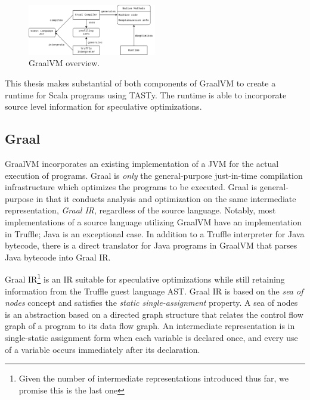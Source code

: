 \begin{figure}[!htb]
	\centering
	\includegraphics[width=0.5\textwidth]{figures/graalvm-pipeline.png}
	\caption{GraalVM overview\cite{graalvm:ir}.}
\end{figure}

This thesis makes substantial of both components of GraalVM to create a runtime for Scala programs using TASTy.
The runtime is able to incorporate source level information for speculative optimizations.

\subsection{Graal}

GraalVM incorporates an existing implementation of a JVM\cite{java:hotspot} for the actual execution of programs.
Graal is \textit{only} the general-purpose just-in-time compilation infrastructure which optimizes the programs to be executed.
Graal is general-purpose in that it conducts analysis and optimization on the same intermediate representation, \textit{Graal IR}, regardless of the source language.
Notably, most implementations of a source language utilizing GraalVM have an implementation in Truffle; Java is an exceptional case.
In addition to a Truffle interpreter for Java bytecode\cite{graalvm:espresso}, there is a direct translator for Java programs in GraalVM that parses Java bytecode into Graal IR.

Graal IR\cite{graalvm:ir}\footnote{Given the number of intermediate representations introduced thus far, we promise this is the last one} is an IR suitable for speculative optimizations while still retaining information from the Truffle guest language AST.
Graal IR is based on the \textit{sea of nodes} concept\cite{click:sea-of-nodes} and satisfies the \textit{static single-assignment}\cite{ssa} property.
A sea of nodes is an abstraction based on a directed graph structure that relates the control flow graph\cite{allen:ctrl-flow-analysis} of a program to its data flow graph\cite{allen:data-flow-analysis}.
An intermediate representation is in single-static assignment form when each variable is declared once, and every use of a variable occurs immediately after its declaration\cite{johnson:use-def-chains}.

